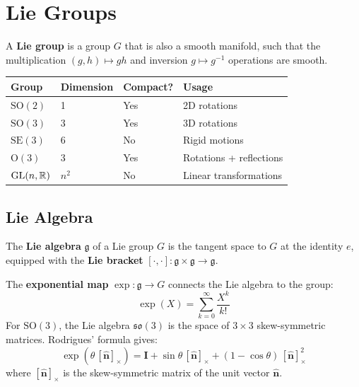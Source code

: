 \section{Lie Groups}

\begin{definition}
A \textbf{Lie group} is a group $G$ that is also a smooth manifold, such that
the multiplication $(g, h) \mapsto gh$ and inversion $g \mapsto g^{-1}$
operations are smooth.
\end{definition}

\begin{example}
\begin{center}
\begin{tabular}{llll}
\toprule
\textbf{Group} & \textbf{Dimension} & \textbf{Compact?} & \textbf{Usage} \\
\midrule
$\mathrm{SO}(2)$ & 1 & Yes & 2D rotations \\
$\mathrm{SO}(3)$ & 3 & Yes & 3D rotations \\
$\mathrm{SE}(3)$ & 6 & No & Rigid motions \\
$\mathrm{O}(3)$ & 3 & Yes & Rotations + reflections \\
$\mathrm{GL}(n, \mathbb{R})$ & $n^2$ & No & Linear transformations \\
\bottomrule
\end{tabular}
\end{center}
\end{example}

\subsection{Lie Algebra}

\begin{definition}
The \textbf{Lie algebra} $\mathfrak{g}$ of a Lie group $G$ is the tangent space
to $G$ at the identity $e$, equipped with the \textbf{Lie bracket}
$[\cdot, \cdot]: \mathfrak{g} \times \mathfrak{g} \to \mathfrak{g}$.
\end{definition}

\begin{keyformulas}[title=\textbf{Exponential map}]
The \textbf{exponential map} $\exp: \mathfrak{g} \to G$ connects the Lie
algebra to the group:
\[
    \exp(X) = \sum_{k=0}^{\infty} \frac{X^k}{k!}
\]
For $\mathrm{SO}(3)$, the Lie algebra $\mathfrak{so}(3)$ is the space of
$3 \times 3$ skew-symmetric matrices. Rodrigues' formula gives:
\[
    \exp(\theta\, [\hat{\mathbf{n}}]_\times) = \mathbf{I} + \sin\theta\,
    [\hat{\mathbf{n}}]_\times + (1 - \cos\theta)\, [\hat{\mathbf{n}}]_\times^2
\]
where $[\hat{\mathbf{n}}]_\times$ is the skew-symmetric matrix of the unit
vector $\hat{\mathbf{n}}$.
\end{keyformulas}

